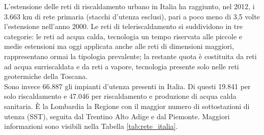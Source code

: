 \documentclass[laurea,oneside,11pt]{USiena_tesiLM3}
\begin{document}
L'estensione delle reti di riscaldamento urbano in Italia ha raggiunto, nel 2012, i 3.663 km di rete primaria (stacchi d'utenza esclusi), pari a poco meno di 3,5 volte l'estensione nell'anno 2000.
Le reti di teleriscaldamento si suddividono in tre categorie: le reti ad acqua calda, tecnologia un tempo riservata alle piccole e medie estensioni ma oggi applicata anche alle reti di dimensioni maggiori, rappresentano ormai la tipologia prevalente; la restante quota è costituita da reti ad acqua surriscaldata e da reti a vapore, tecnologia presente solo nelle reti geotermiche della Toscana.\\

Sono invece 66.887 gli impianti d'utenza presenti in Italia. Di questi 19.841 per solo riscaldamento e 47.046 per riscaldamento e
produzione di acqua calda sanitaria. \`E la Lombardia la Regione con il maggior numero di sottostazioni di utenza (SST), seguita dal Trentino Alto Adige e dal Piemonte. Maggiori informazioni sono visibili nella Tabella \ref{tab:rete_italia}.
\end{document}
